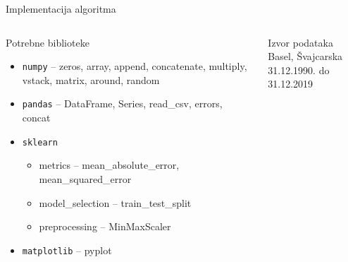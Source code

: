 \documentclass{beamer}
\begin{document}
\begin{frame}{Implementacija algoritma}
    \begin{columns}
        \begin{block}{Potrebne biblioteke}
            \begin{itemize}
                \item \texttt{numpy}  -- 
                zeros, array, append, concatenate, multiply, vstack, matrix, around, random
                \item \texttt{pandas} -- DataFrame, Series, read\_csv, errors, concat
                \item \texttt{sklearn} 
                    \begin{itemize}
                        \item metrics -- mean\_absolute\_error, mean\_squared\_error
                        \item model\_selection -- train\_test\_split
                        \item preprocessing -- MinMaxScaler
                    \end{itemize}
                \item \texttt{matplotlib} -- pyplot
            \end{itemize}
        \end{block}
        \begin{block}{Izvor podataka}
            \small{
            Basel, Švajcarska\\
            31.12.1990. do 31.12.2019}
            \begin{center}

\end{center}
\end{block}
\end{columns}
\end{frame}
\end{document}
